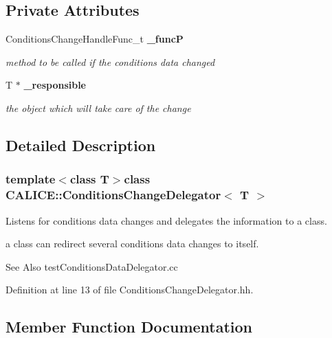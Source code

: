 \subsection*{Private Attributes}
\begin{DoxyCompactItemize}
\item 
Conditions\-Change\-Handle\-Func\-\_\-t {\bf \-\_\-func\-P}\label{classCALICE_1_1ConditionsChangeDelegator_adaf17b9ce91ac651de46c007b69f5719}

\begin{DoxyCompactList}\small\item\em method to be called if the conditions data changed \end{DoxyCompactList}\item 
T $\ast$ {\bf \-\_\-responsible}\label{classCALICE_1_1ConditionsChangeDelegator_a0d8f29b22856a229930ee6246ad066fd}

\begin{DoxyCompactList}\small\item\em the object which will take care of the change \end{DoxyCompactList}\end{DoxyCompactItemize}


\subsection{Detailed Description}
\subsubsection*{template$<$class T$>$class C\-A\-L\-I\-C\-E\-::\-Conditions\-Change\-Delegator$<$ T $>$}

Listens for conditions data changes and delegates the information to a class. 

a class can redirect several conditions data changes to itself. \begin{DoxySeeAlso}{See Also}
test\-Conditions\-Data\-Delegator.\-cc 
\end{DoxySeeAlso}


Definition at line 13 of file Conditions\-Change\-Delegator.\-hh.



\subsection{Member Function Documentation}
